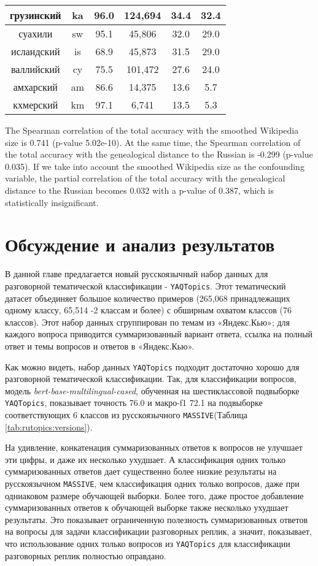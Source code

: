 \begin{table*}
{\begin{tabular}{|c|c|c||c|c|c|}
грузинский & ka & 96.0 & 124,694 & 34.4 & 32.4\\ \hline
суахили & sw & 95.1 & 45,806 & 32.0 & 29.0\\ \hline
исландский & is & 68.9 & 45,873 & 31.5 & 29.0\\ \hline
валлийский & cy & 75.5 & 101,472 & 27.6 & 24.0\\ \hline
амхарский & am & 86.6 & 14,375 & 13.6 & 5.7\\ \hline
кхмерский & km & 97.1 & 6,741 & 13.5 & 5.3\\ \hline
\end{tabular}
}
\end{table*}

The Spearman correlation of the total accuracy with the smoothed Wikipedia size is 0.741 (p-value 5.02e-10). At the same time, the Spearman correlation of the total accuracy with the genealogical distance to the Russian is -0.299 (p-value 0.035).  If we take into account the smoothed Wikipedia size as the confounding variable, the partial correlation of the total accuracy with the genealogical distance to the Russian becomes 0.032 with a p-value of 0.387, which is statistically insignificant.


\section{Обсуждение и анализ результатов} 

В данной главе предлагается новый русскоязычный набор данных для разговорной тематической классификации - \texttt{YAQTopics}. Этот тематический датасет объединяет большое количество примеров (265,068 принадлежащих одному классу, 65,514 -2 классам и более) с обширным охватом классов (76 классов). Этот набор данных сгруппирован по темам из «Яндекс.Кью»; для каждого вопроса приводится суммаризованный вариант ответа, ссылка на полный ответ и темы вопросов и ответов в «Яндекс.Кью».

Как можно видеть, набор данных \texttt{YAQTopics} подходит достаточно хорошо для разговорной тематической классификации. Так, для классификации вопросов, модель \textit{bert-base-multilingual-cased}, обученная на шестиклассовой подвыборке \texttt{YAQTopics}, показывает точность 76.0 и макро-f1 72.1 на подвыборке соответствующих 6 классов из русскоязычного \texttt{MASSIVE}(Таблица \ref{tab:rutopics:versions}). 

 На удивление, конкатенация суммаризованных ответов к вопросов не улучшает эти цифры, и даже их несколько ухудшает. А классификация одних только суммаризованных ответов дает существенно более низкие результаты на русскоязычном \texttt{MASSIVE}, чем классификация одних только вопросов, даже при одниаковом размере обучающей выборки. Более того, даже простое добавление суммаризованных ответов к обучающей выборке также несколько ухудшает результаты. Это показывает ограниченную полезность суммаризованных ответов на вопросы для задачи классификации разговорных реплик, а значит, показывает, что использование одних только вопросов  из \texttt{YAQTopics} для классификации разговорных реплик полностью оправдано. 

